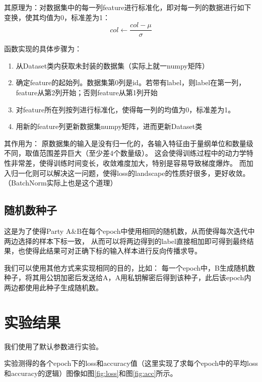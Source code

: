\documentclass[twoside,11pt]{article}
\begin{document}
其原理为：对数据集中的每一列feature进行标准化，即对每一列的数据进行如下变换，使其均值为0，标准差为1：
$$
    col \leftarrow \frac{col-\mu}{\sigma}
$$

函数实现的具体步骤为：
\begin{enumerate}
    \item 从Dataset类内获取未封装的数据集（实际上就一numpy矩阵）
    \item 确定feature的起始列。数据集第0列是id。若带有label，则label在第一列，feature从第2列开始；否则feature从第1列开始
    \item 对feature所在列按列进行标准化，使得每一列的均值为0，标准差为1。
    \item 用新的feature列更新数据集numpy矩阵，进而更新Dataset类
\end{enumerate}

其作用为：
原数据集的输入是没有归一化的，各输入特征由于量纲单位和数量级不同，取值范围差异巨大（至少差4个数量级）。
这会使得训练过程中的动力学特性非常差，使得训练时间变长，收敛难度加大，特别是容易导致梯度爆炸。
而加入归一化则可以解决这一问题，使得loss的landscape的性质好很多，更好收敛。（BatchNorm实际上也是这个道理）


\subsection{随机数种子}

这是为了使得Party A\&B在每个epoch中使用相同的随机数，从而使得每次迭代中两边选择的样本下标一致，
从而可以将两边得到的label直接相加即可得到最终结果，也使得此结果可对正确下标的输入样本进行反向传播求导。

我们可以使用其他方式来实现相同的目的，比如：
每一个epoch中，B生成随机数种子，将其用公钥加密后发送给A，A用私钥解密后得到该种子，此后该epoch内两边都使用此种子生成随机数。

\section{实验结果}
我们使用了默认参数进行实验。

实验测得的各个epoch下的loss和accuracy值（这里实现了求每个epoch中的平均loss和accuracy的逻辑）图像如图\ref{fig:loss}和图\ref{fig:acc}所示。
\end{document}
